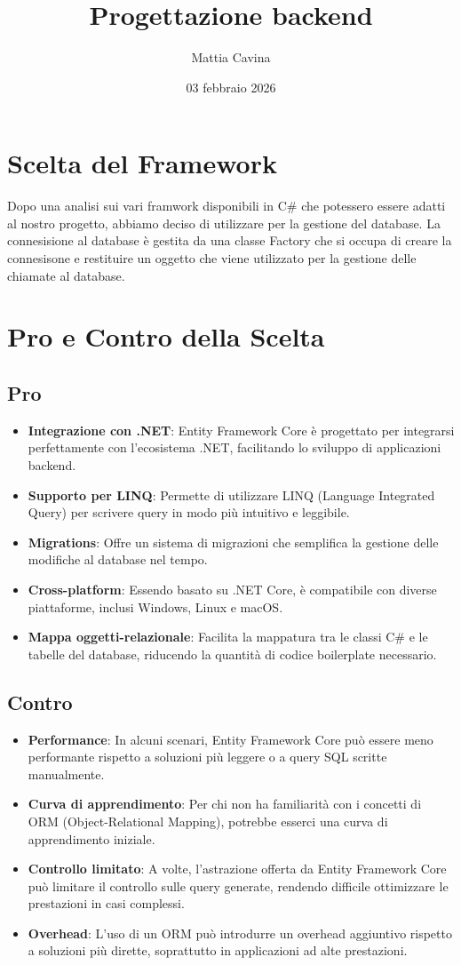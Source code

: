 \documentclass[12pt, a4paper]{article}
\title{Progettazione backend}
\author{Mattia Cavina}
\date{03 febbraio 2026}
\begin{document}
\maketitle
\section{Scelta del Framework}
Dopo una analisi sui vari framwork disponibili in C\# che potessero essere adatti al nostro progetto,
abbiamo deciso di utilizzare  per la gestione del database.
La connesisione al database è gestita da una classe Factory che si occupa di
creare la connesisone e restituire un oggetto  che viene utilizzato per la gestione delle chiamate al database.
\section{Pro e Contro della Scelta}
\subsection{Pro}
\begin{itemize}
    \item \textbf{Integrazione con .NET}: Entity Framework Core è progettato per integrarsi perfettamente con l'ecosistema .NET, facilitando lo sviluppo di applicazioni backend.
    \item \textbf{Supporto per LINQ}: Permette di utilizzare LINQ (Language Integrated Query) per scrivere query in modo più intuitivo e leggibile.
    \item \textbf{Migrations}: Offre un sistema di migrazioni che semplifica la gestione delle modifiche al database nel tempo.
    \item \textbf{Cross-platform}: Essendo basato su .NET Core, è compatibile con diverse piattaforme, inclusi Windows, Linux e macOS.
    \item \textbf{Mappa oggetti-relazionale}: Facilita la mappatura tra le classi C\# e le tabelle del database, riducendo la quantità di codice boilerplate necessario.
\end{itemize}
\subsection{Contro}
\begin{itemize}
    \item \textbf{Performance}: In alcuni scenari, Entity Framework Core può essere meno performante rispetto a soluzioni più leggere o a query SQL scritte manualmente.
    \item \textbf{Curva di apprendimento}: Per chi non ha familiarità con i concetti di ORM (Object-Relational Mapping), potrebbe esserci una curva di apprendimento iniziale.
    \item \textbf{Controllo limitato}: A volte, l'astrazione offerta da Entity Framework Core può limitare il controllo sulle query generate, rendendo difficile ottimizzare le prestazioni in casi complessi.
    \item \textbf{Overhead}: L'uso di un ORM può introdurre un overhead aggiuntivo rispetto a soluzioni più dirette, soprattutto in applicazioni ad alte prestazioni.
\end{itemize}
\end{document}
